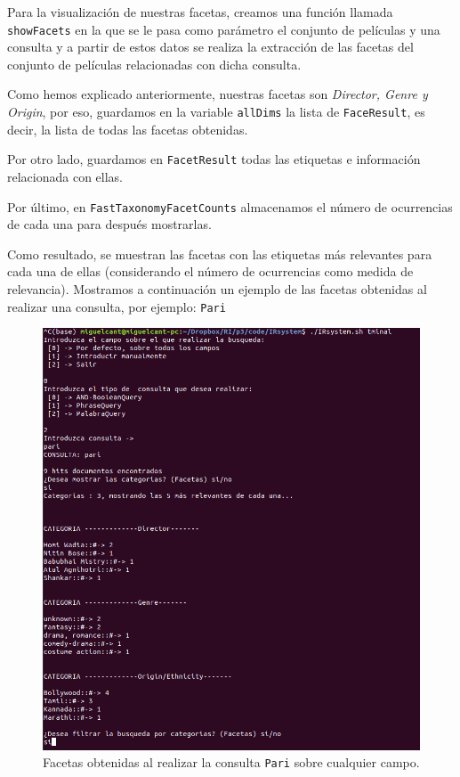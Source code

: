 Para la visualización de nuestras facetas, creamos una función llamada
\texttt{showFacets} en la que se le pasa como parámetro el conjunto de películas y una consulta y a partir de estos datos se realiza la extracción de las facetas del conjunto de películas relacionadas con dicha consulta.

Como hemos explicado anteriormente, nuestras facetas son \textit{Director, Genre y Origin}, por eso, guardamos en la variable \texttt{allDims} la lista de \texttt{FaceResult}, es decir, la lista de todas las facetas obtenidas.

Por otro lado, guardamos en \texttt{FacetResult} todas las etiquetas e información relacionada con ellas.

Por último, en
\texttt{FastTaxonomyFacetCounts} almacenamos el número de ocurrencias de cada una para después mostrarlas.


Como resultado, se muestran las facetas con las etiquetas más relevantes para cada una de ellas (considerando el número de ocurrencias como medida de relevancia).
\newpage
Mostramos a continuación un ejemplo de las facetas obtenidas al realizar una consulta, por ejemplo: \texttt{Pari}

\begin{figure}[H]
	\centering
	\includegraphics[scale=0.5]{images/consulta-facetas.png}
	\caption{Facetas obtenidas al realizar la consulta \texttt{Pari} sobre cualquier campo.}
\end{figure}





